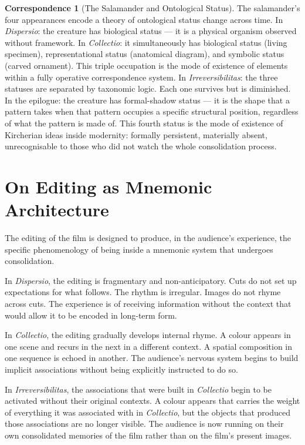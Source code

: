 \documentclass[12pt, a4paper, twoside]{memoir}
\theoremstyle{definition}
\newtheorem{correspondence}{Correspondence}[chapter]
\theoremstyle{remark}
\begin{document}
\begin{correspondence}[The Salamander and Ontological Status]
The salamander's four appearances encode a theory of ontological status change across time. In \textit{Dispersio}: the creature has biological status --- it is a physical organism observed without framework. In \textit{Collectio}: it simultaneously has biological status (living specimen), representational status (anatomical diagram), and symbolic status (carved ornament). This triple occupation is the mode of existence of elements within a fully operative correspondence system. In \textit{Irreversibilitas}: the three statuses are separated by taxonomic logic. Each one survives but is diminished. In the epilogue: the creature has formal-shadow status --- it is the shape that a pattern takes when that pattern occupies a specific structural position, regardless of what the pattern is made of. This fourth status is the mode of existence of Kircherian ideas inside modernity: formally persistent, materially absent, unrecognisable to those who did not watch the whole consolidation process.
\end{correspondence}

\chapter{On Editing as Mnemonic Architecture}

The editing of the film is designed to produce, in the audience's experience, the specific phenomenology of being inside a mnemonic system that undergoes consolidation.

In \textit{Dispersio}, the editing is fragmentary and non-anticipatory. Cuts do not set up expectations for what follows. The rhythm is irregular. Images do not rhyme across cuts. The experience is of receiving information without the context that would allow it to be encoded in long-term form.

In \textit{Collectio}, the editing gradually develops internal rhyme. A colour appears in one scene and recurs in the next in a different context. A spatial composition in one sequence is echoed in another. The audience's nervous system begins to build implicit associations without being explicitly instructed to do so.

In \textit{Irreversibilitas}, the associations that were built in \textit{Collectio} begin to be activated without their original contexts. A colour appears that carries the weight of everything it was associated with in \textit{Collectio}, but the objects that produced those associations are no longer visible. The audience is now running on their own consolidated memories of the film rather than on the film's present images.
\end{document}

